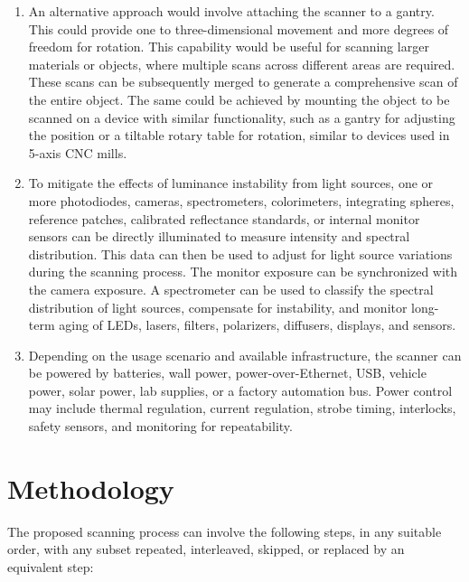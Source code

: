 \documentclass[11pt, twoside, listof=totocnumbered, bibliography=totocnumbered]{scrartcl}
\begin{document}
\begin{enumerate}
		\item An alternative approach would involve attaching the scanner to a gantry. This could provide one to three-dimensional movement and more degrees of freedom for rotation. This capability would be useful for scanning larger materials or objects, where multiple scans across different areas are required. These scans can be subsequently merged to generate a comprehensive scan of the entire object. The same could be achieved by mounting the object to be scanned on a device with similar functionality, such as a gantry for adjusting the position or a tiltable rotary table for rotation, similar to devices used in 5-axis CNC mills.
		
		\item To mitigate the effects of luminance instability from light sources, one or more photodiodes, cameras, spectrometers, colorimeters, integrating spheres, reference patches, calibrated reflectance standards, or internal monitor sensors can be directly illuminated to measure intensity and spectral distribution. This data can then be used to adjust for light source variations during the scanning process. The monitor exposure can be synchronized with the camera exposure. A spectrometer can be used to classify the spectral distribution of light sources, compensate for instability, and monitor long-term aging of LEDs, lasers, filters, polarizers, diffusers, displays, and sensors.
		
		\item Depending on the usage scenario and available infrastructure, the scanner can be powered by batteries, wall power, power-over-Ethernet, USB, vehicle power, solar power, lab supplies, or a factory automation bus. Power control may include thermal regulation, current regulation, strobe timing, interlocks, safety sensors, and monitoring for repeatability.
	\end{enumerate}
	
	\section{Methodology}
	The proposed scanning process can involve the following steps, in any suitable order, with any subset repeated, interleaved, skipped, or replaced by an equivalent step:
	
\end{document}
